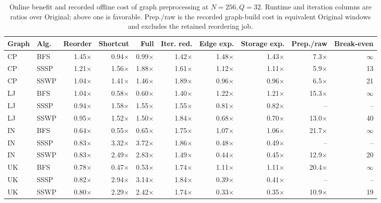 \begin{table}[t]
  \centering
  \caption{Online benefit and recorded offline cost of graph preprocessing at
  $N=256,Q=32$.  Runtime and iteration columns are ratios over Original;
  above one is favorable. Prep./raw is the recorded graph-build cost in
  equivalent Original windows and excludes the retained reordering job.}
  \label{tab:preprocessing-cost}
  \scriptsize
  \setlength{\tabcolsep}{3.4pt}
  \begin{tabular}{llrrrrrrrr}
    \toprule
    Graph & Alg. & Reorder & Shortcut & Full & Iter. red. & Edge exp. & Storage exp. & Prep./raw & Break-even \\
    \midrule
    CP & BFS & 1.45$\times$ & 0.94$\times$ & 0.99$\times$ & 1.42$\times$ & 1.48$\times$ & 1.43$\times$ & 7.3$\times$ & $\infty$ \\
    CP & SSSP & 1.21$\times$ & 1.56$\times$ & 1.88$\times$ & 1.61$\times$ & 1.12$\times$ & 1.11$\times$ & 5.9$\times$ & 13 \\
    CP & SSWP & 1.04$\times$ & 1.41$\times$ & 1.46$\times$ & 1.89$\times$ & 0.96$\times$ & 0.96$\times$ & 6.5$\times$ & 21 \\
    \midrule
    LJ & BFS & 1.04$\times$ & 0.58$\times$ & 0.60$\times$ & 1.40$\times$ & 1.22$\times$ & 1.21$\times$ & 15.3$\times$ & $\infty$ \\
    LJ & SSSP & 0.94$\times$ & 1.58$\times$ & 1.55$\times$ & 1.55$\times$ & 0.81$\times$ & 0.82$\times$ & -- & -- \\
    LJ & SSWP & 0.95$\times$ & 1.52$\times$ & 1.50$\times$ & 1.84$\times$ & 0.68$\times$ & 0.70$\times$ & 13.0$\times$ & 40 \\
    \midrule
    IN & BFS & 0.64$\times$ & 0.55$\times$ & 0.65$\times$ & 1.75$\times$ & 1.07$\times$ & 1.06$\times$ & 21.7$\times$ & $\infty$ \\
    IN & SSSP & 0.83$\times$ & 3.32$\times$ & 3.72$\times$ & 1.86$\times$ & 0.48$\times$ & 0.49$\times$ & -- & -- \\
    IN & SSWP & 0.83$\times$ & 2.49$\times$ & 2.83$\times$ & 1.49$\times$ & 0.44$\times$ & 0.45$\times$ & 12.9$\times$ & 20 \\
    \midrule
    UK & BFS & 0.78$\times$ & 0.47$\times$ & 0.53$\times$ & 1.74$\times$ & 1.11$\times$ & 1.11$\times$ & 20.4$\times$ & $\infty$ \\
    UK & SSSP & 0.82$\times$ & 2.94$\times$ & 3.14$\times$ & 1.84$\times$ & 0.39$\times$ & 0.41$\times$ & -- & -- \\
    UK & SSWP & 0.80$\times$ & 2.29$\times$ & 2.42$\times$ & 1.74$\times$ & 0.33$\times$ & 0.35$\times$ & 10.9$\times$ & 19 \\

\end{tabular}
\end{table}
